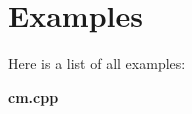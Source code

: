 \section{Examples}
Here is a list of all examples:\begin{CompactList}
\item 
{\bf cm.cpp}
\end{CompactList}
